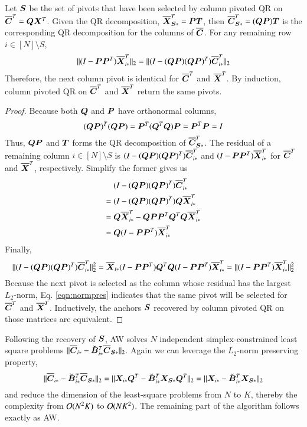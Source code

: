 \begin{lemma}\label{lem:qrequiv}
  Let $\bm{S}$ be the set of pivots that have been selected by column pivoted QR on
  $\overline{\bm{C}}^T = \bm{Q}\bm{X}^T$. Given the QR decomposition, $\overline{\bm{X}}_{\bm{S}\ast}^T = \bm{P}
  \bm{T}$, then $\overline{\bm{C}}_{\bm{S}\ast}^T = (\bm{Q}\bm{P})\bm{T}$ is the corresponding QR
  decomposition for the columns of $\overline{\bm{C}}$. For any remaining row $i\in 
  [N]\setminus S$,
  \begin{equation}
  	\|(I-\bm{P}\bm{P}^T)\overline{\bm{X}}_{i\ast}^T\|_2 = \|(I-(\bm{Q}\bm{P})(\bm{Q}\bm{P})^T)\overline{\bm{C}}_
  	{i\ast}^T\|_2
  \end{equation}
  Therefore, the next column pivot is identical for $\overline{\bm{C}}^T$ and $\overline{\bm{X}}^T$. 
  By induction, column pivoted QR on $\overline{\bm{C}}^T$ and $\overline{\bm{X}}^T$ return the same
  pivots.
\end{lemma}
\begingroup
\allowdisplaybreaks
\begin{proof}
  Because both $\bm{Q}$ and $\bm{P}$ have orthonormal columns,
  \begin{equation}
    (\bm{Q}\bm{P})^T(\bm{Q}\bm{P}) = \bm{P}^T(\bm{Q}^T\bm{Q})\bm{P} = \bm{P}^T\bm{P} = I
  \end{equation}
  Thus, $\bm{Q}\bm{P}$ and $\bm{T}$ forms the QR decomposition of $\overline{\bm{C}}_{\bm{S}\ast}^T$.
  The residual of a remaining column $i\in[N]\setminus S$ is $(I-(\bm{Q}\bm{P})(\bm{Q}
  \bm{P})^T) \overline{\bm{C}}_{i\ast}^T$ and $(I-\bm{P}\bm{P}^T)\overline{\bm{X}}_{i\ast}^T$ for $\overline{\bm{C}}^T$
  and $\overline{\bm{X}}^T$, respectively. Simplify the former gives us
  \begin{align*}
    &(I-(\bm{Q}\bm{P})(\bm{Q}\bm{P})^T)\overline{\bm{C}}_{i\ast}^T \\
    ={} & (I-(\bm{Q}\bm{P})(\bm{Q}\bm{P})^T)\bm{Q}\overline{\bm{X}}_{i\ast}^T \\
    ={} & \bm{Q}\overline{\bm{X}}_{i\ast}^T - \bm{Q}\bm{P}\bm{P}^T\bm{Q}^T\bm{Q}\overline{\bm{X}}_{i\ast}^T\\
    ={} & \bm{Q}(I-\bm{P}\bm{P}^T)\overline{\bm{X}}_{i\ast}^T
  \end{align*}
  Finally,
  \begin{equation}\label{eqn:normpres}
    \|(I-(\bm{Q}\bm{P})(\bm{Q}\bm{P})^T)\overline{\bm{C}}_{i\ast}^T\|_2^2 = \overline{\bm{X}}_{i\ast}(I-\bm{P}\bm{P}^T)
    \bm{Q}^T\bm{Q}(I-\bm{P}\bm{P}^T)\overline{\bm{X}}_{i\ast}^T = \|(I-\bm{P}\bm{P}^T)\overline{\bm{X}}_{i\ast}^T\|_2^2
  \end{equation}
  Because the next pivot is selected as the column whose residual has the
  largest $L_2$\hyp{}norm, Eq. \ref{eqn:normpres} indicates that the same pivot
  will be selected for $\overline{\bm{C}}^T$ and $\overline{\bm{X}}^T$. Inductively, the anchors $\bm{S}$
  recovered by column pivoted QR on those matrices are equivalent.
\end{proof}
\endgroup

Following the recovery of $\bm{S}$, AW solves $N$ independent simplex-constrained
least square problems $\|\overline{\bm{C}}_{i\ast} - \smash{\breve{\bm{B}}}_{i\ast}^T\overline{\bm{C}}_
{\bm{S}\ast}\|_2$. Again we can leverage the $L_2$-norm preserving property, 
\begin{equation}\label{eqn:lrls}
  \|\overline{\bm{C}}_{i\ast} - \smash{\breve{\bm{B}}}_{i\ast}^T\overline{\bm{C}}_{\bm{S}\ast}\|_2 = \|\bm{X}_{i\ast}\bm{Q}^T
  - \smash{\breve{\bm{B}}}_{i\ast}^T\bm{X}_{\bm{S}\ast}\bm{Q}^T\|_2 = \|\bm{X}_{i\ast} - \smash{\breve{\bm{B}}}_{i\ast}^T 
  \bm{X}_{\bm{S}\ast}\|_2
\end{equation}
and reduce the dimension of the least\hyp{}square problems from $N$ to $K$,
thereby the complexity from $\mathcal{O}(N^2K)$ to $\mathcal{O}(NK^2)$. The remaining part
of the algorithm follows exactly as AW.


